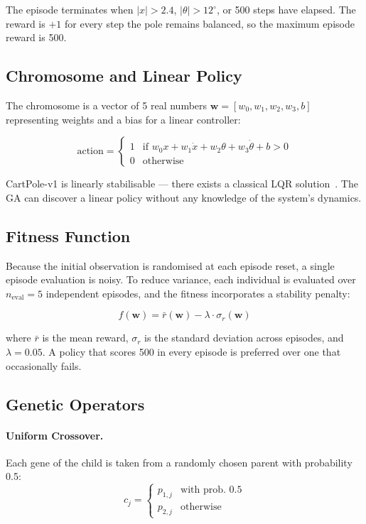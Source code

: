 \documentclass[12pt,a4paper]{article}
\begin{document}
The episode terminates when $|x| > 2.4$, $|\theta| > 12^{\circ}$, or 500 steps have elapsed. The reward is $+1$ for every step the pole remains balanced, so the maximum episode reward is 500.

\subsection{Chromosome and Linear Policy}

The chromosome is a vector of 5 real numbers $\mathbf{w} = [w_0, w_1, w_2, w_3, b]$ representing weights and a bias for a linear controller:

\begin{equation}
\text{action} = \begin{cases}
1 & \text{if } w_0 x + w_1 \dot{x} + w_2 \theta + w_3 \dot{\theta} + b > 0 \\
0 & \text{otherwise}
\end{cases}
\label{eq:policy}
\end{equation}

CartPole-v1 is linearly stabilisable — there exists a classical LQR solution~\cite{ogata2010}. The GA can discover a linear policy without any knowledge of the system's dynamics.

\subsection{Fitness Function}

Because the initial observation is randomised at each episode reset, a single episode evaluation is noisy. To reduce variance, each individual is evaluated over $n_\text{eval} = 5$ independent episodes, and the fitness incorporates a stability penalty:

\begin{equation}
f(\mathbf{w}) = \bar{r}(\mathbf{w}) - \lambda \cdot \sigma_r(\mathbf{w})
\label{eq:cartpole_fitness}
\end{equation}

where $\bar{r}$ is the mean reward, $\sigma_r$ is the standard deviation across episodes, and $\lambda = 0.05$. A policy that scores 500 in every episode is preferred over one that occasionally fails.

\subsection{Genetic Operators}

\paragraph{Uniform Crossover.}
Each gene of the child is taken from a randomly chosen parent with probability 0.5:
\[
c_j = \begin{cases} p_{1,j} & \text{with prob. } 0.5 \\ p_{2,j} & \text{otherwise} \end{cases}
\]
\end{document}
